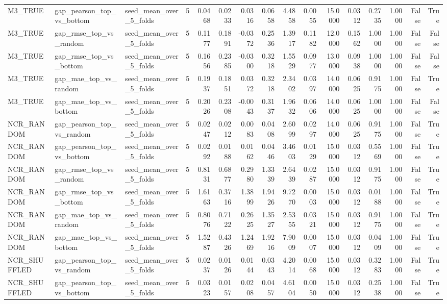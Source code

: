 \begin{tabular}{lllrrrrrrrrrrrrr}
M3_TRUE & gap_pearson_top_vs_bottom & seed_mean_over_5_folds & 5 & 0.0468 & 0.0233 & 0.0316 & 0.0658 & 4.4858 & 0.0055 & 15.0000 & 0.0312 & 0.2735 & 1.0000 & False & True \\
M3_TRUE & gap_rmse_top_vs_random & seed_mean_over_5_folds & 5 & 0.1177 & 0.1891 & -0.0372 & 0.2536 & 1.3917 & 0.1182 & 12.0000 & 0.1562 & 1.0000 & 1.0000 & False & False \\
M3_TRUE & gap_rmse_top_vs_bottom & seed_mean_over_5_folds & 5 & 0.1656 & 0.2385 & -0.0300 & 0.3218 & 1.5529 & 0.0977 & 13.0000 & 0.0938 & 1.0000 & 1.0000 & False & False \\
M3_TRUE & gap_mae_top_vs_random & seed_mean_over_5_folds & 5 & 0.1937 & 0.1851 & 0.0372 & 0.3218 & 2.3402 & 0.0397 & 14.0000 & 0.0625 & 0.9175 & 1.0000 & False & True \\
M3_TRUE & gap_mae_top_vs_bottom & seed_mean_over_5_folds & 5 & 0.2026 & 0.2308 & -0.0043 & 0.3137 & 1.9632 & 0.0606 & 14.0000 & 0.0625 & 1.0000 & 1.0000 & False & False \\
NCR_RANDOM & gap_pearson_top_vs_random & seed_mean_over_5_folds & 5 & 0.0247 & 0.0212 & 0.0083 & 0.0408 & 2.6099 & 0.0297 & 14.0000 & 0.0625 & 0.9175 & 1.0000 & False & True \\
NCR_RANDOM & gap_pearson_top_vs_bottom & seed_mean_over_5_folds & 5 & 0.0292 & 0.0188 & 0.0162 & 0.0446 & 3.4603 & 0.0129 & 15.0000 & 0.0312 & 0.5569 & 1.0000 & False & True \\
NCR_RANDOM & gap_rmse_top_vs_random & seed_mean_over_5_folds & 5 & 0.8131 & 0.6877 & 0.2980 & 1.3339 & 2.6439 & 0.0287 & 15.0000 & 0.0312 & 0.9175 & 1.0000 & False & True \\
NCR_RANDOM & gap_rmse_top_vs_bottom & seed_mean_over_5_folds & 5 & 1.6163 & 0.3716 & 1.3899 & 1.9426 & 9.7270 & 0.0003 & 15.0000 & 0.0312 & 0.0188 & 1.0000 & False & True \\
NCR_RANDOM & gap_mae_top_vs_random & seed_mean_over_5_folds & 5 & 0.8076 & 0.7122 & 0.2625 & 1.3527 & 2.5355 & 0.0321 & 15.0000 & 0.0312 & 0.9175 & 1.0000 & False & True \\
NCR_RANDOM & gap_mae_top_vs_bottom & seed_mean_over_5_folds & 5 & 1.5287 & 0.4326 & 1.2469 & 1.9216 & 7.9009 & 0.0007 & 15.0000 & 0.0312 & 0.0409 & 1.0000 & False & True \\
NCR_SHUFFLED & gap_pearson_top_vs_random & seed_mean_over_5_folds & 5 & 0.0237 & 0.0126 & 0.0144 & 0.0343 & 4.2014 & 0.0068 & 15.0000 & 0.0312 & 0.3283 & 1.0000 & False & True \\
NCR_SHUFFLED & gap_pearson_top_vs_bottom & seed_mean_over_5_folds & 5 & 0.0323 & 0.0157 & 0.0208 & 0.0457 & 4.6104 & 0.0050 & 15.0000 & 0.0312 & 0.2538 & 1.0000 & False & True \\

\end{tabular}
